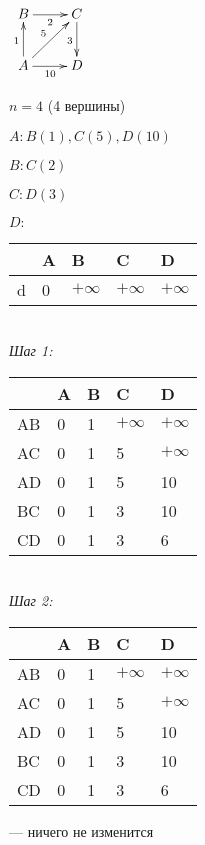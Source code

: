 \documentclass[a4paper, 12pt] {article}
\begin{document}
$ \begin{matrix}
	\xymatrix{
		B \ar@{->}[r]_2  \ar@{<-}[d]_1 & C \ar@{<-}[ld]_5 \ar@{->}[d]_3  \\
		A \ar@{->}[r]_{10}   & D   \\
	}
\end{matrix} $

$ n = 4 $ (4 вершины)

$ A: B(1), C(5), D(10) $

$ B:C(2) $

$ C:D(3) $

$ D: $\\

\begin{tabular}{ | l | l | l |  l | l | }
	\hline
	& A & B & C  & D \\ \hline
	d & 0 & $ + \infty $ & $ + \infty $ & $ + \infty $ \\ \hline

\end{tabular}\\

\textit{Шаг 1:}

\begin{tabular}{ | l | l | l |  l | l | }
	\hline
	& A & B & C  & D \\ \hline
	AB & 0 & 1 & $ + \infty $  & $ + \infty $ \\ \hline
	AC & 0 & 1 & 5 & $ + \infty $ \\ \hline
	AD & 0 & 1 & 5 & 10 \\ \hline
	BC & 0 & 1 & 3 & 10 \\ \hline
	CD & 0 & 1 & 3 & 6 \\
	\hline
\end{tabular}\\

\textit{Шаг 2:}

\begin{tabular}{ | l | l | l |  l | l | }
	\hline
	& A & B & C  & D \\ \hline
	AB & 0 & 1 & $ + \infty $  & $ + \infty $ \\ \hline
	AC & 0 & 1 & 5 & $ + \infty $ \\ \hline
	AD & 0 & 1 & 5 & 10 \\ \hline
	BC & 0 & 1 & 3 & 10 \\ \hline
	CD & 0 & 1 & 3 & 6 \\
	\hline
\end{tabular} --- ничего не изменится\\
\end{document}
